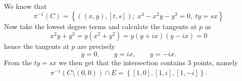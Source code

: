 \documentclass[a4paper, 12pt]{article}
\begin{document}
\begin{Exercise}
\begin{enumerate}[label=(\roman*)]
            We know that
            \[
                \pi^{-1}(C)
                = \left\{ ((x, y), [t, s]) ; \; x^4 - x^2y - y^3 = 0, \; ty = sx \right\}
            \]
            Now take the lowest degree terms and calculate the tangents at $p$ as
            \[
                x^2y + y^3 = y(x^2 + y^2) = y(y + ix)(y - ix) = 0
            \]
            hence the tangents at $p$ are precisely
            \[
                y = 0, \quad\quad y = ix, \quad\quad y = -ix.
            \]
            From the $ty = sx$ we then get that the intersection contains $3$ points,
            namely
            \[
                \overline{\pi^{-1}(C \setminus (0, 0))} \cap E
                = \left\{ [1, 0], [1, i], [1, -i] \right\}.
            \]
    \end{enumerate}
\end{Exercise}
 
\end{document}
